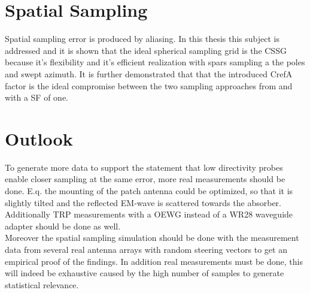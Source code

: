 \section{Spatial Sampling}

Spatial sampling error is produced by aliasing. In this thesis this subject is addressed and it is shown that the ideal spherical sampling grid is the \acf{CSSG} because it's flexibility and it's efficient realization with spars sampling a the poles and swept azimuth. It is further demonstrated that that the introduced \ac{CrefA} factor is the ideal compromise between the two sampling approaches from \cite{hansen} and \cite{2018arXiv180310993F} with a \acf{SF} of one.

\section{Outlook}

To generate more data to support the statement that low directivity probes enable closer sampling at the same error, more real measurements should be done. E.q. the mounting of the patch antenna could be optimized, so that it is slightly tilted and the reflected \acf{EM}-wave is scattered towards the absorber. Additionally \ac{TRP} measurements with a \ac{OEWG} instead of a WR28 waveguide adapter should be done as well.\\
Moreover the spatial sampling simulation should be done with the measurement data from several real antenna arrays with random steering vectors to get an empirical proof of the findings. In addition real measurements must be done, this will indeed be exhaustive caused by the high number of samples to generate statistical relevance.